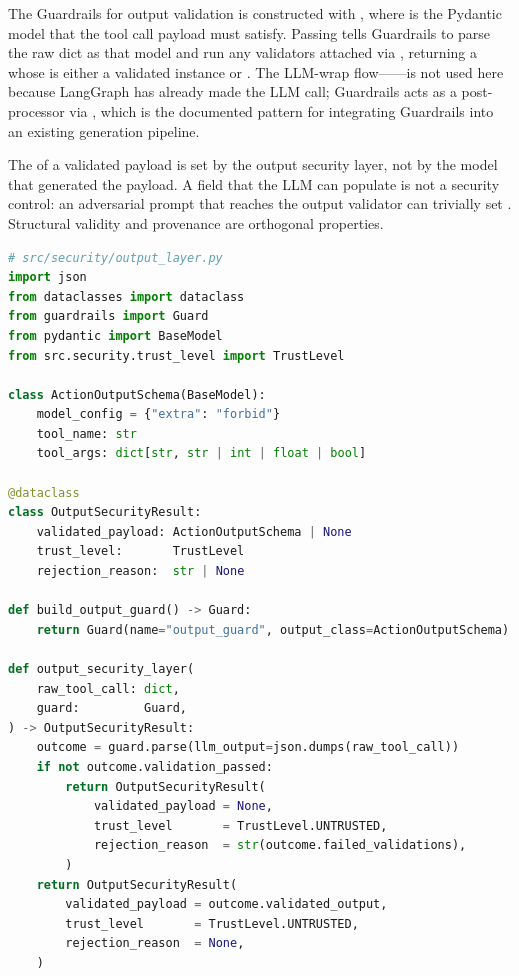 The Guardrails  for output validation is constructed with
,
where  is the Pydantic model that the tool
call payload must satisfy. Passing  tells Guardrails
to parse the raw dict as that model and run any validators attached via
, returning a  whose
 is either a validated
 instance or . The LLM-wrap
flow------is not used here because
LangGraph has already made the LLM call; Guardrails acts as a
post-processor via , which is the documented
pattern for integrating Guardrails into an existing generation
pipeline.

\begin{notebox}
The  of a validated payload is set by the output
security layer, not by the model that generated the payload. A field
that the LLM can populate is not a security control: an adversarial
prompt that reaches the output validator can trivially set
. Structural validity and provenance
are orthogonal properties.
\end{notebox}

\begin{lstlisting}[language=Python,
  caption={ActionOutputSchema, OutputSecurityResult, output\_security\_layer},
  label={lst:sec-output}]
# src/security/output_layer.py
import json
from dataclasses import dataclass
from guardrails import Guard
from pydantic import BaseModel
from src.security.trust_level import TrustLevel

class ActionOutputSchema(BaseModel):
    model_config = {"extra": "forbid"}
    tool_name: str
    tool_args: dict[str, str | int | float | bool]

@dataclass
class OutputSecurityResult:
    validated_payload: ActionOutputSchema | None
    trust_level:       TrustLevel
    rejection_reason:  str | None

def build_output_guard() -> Guard:
    return Guard(name="output_guard", output_class=ActionOutputSchema)

def output_security_layer(
    raw_tool_call: dict,
    guard:         Guard,
) -> OutputSecurityResult:
    outcome = guard.parse(llm_output=json.dumps(raw_tool_call))
    if not outcome.validation_passed:
        return OutputSecurityResult(
            validated_payload = None,
            trust_level       = TrustLevel.UNTRUSTED,
            rejection_reason  = str(outcome.failed_validations),
        )
    return OutputSecurityResult(
        validated_payload = outcome.validated_output,
        trust_level       = TrustLevel.UNTRUSTED,
        rejection_reason  = None,
    )
\end{lstlisting}


